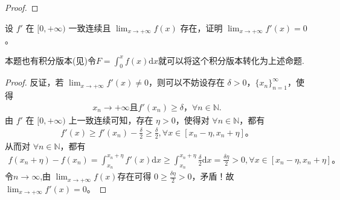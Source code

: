 \documentclass[../../main.tex]{subfiles}%
\begin{document}
\begin{proof}
\end{proof}

\begin{proposition}\label{proposition:经典导数一致连续问题}
设 $f'$ 在 $[0,+\infty)$ 一致连续且 $\lim_{x \to +\infty} f(x)$ 存在，证明 $\lim_{x \to +\infty} f'(x) = 0$。
\end{proposition}
\begin{note}
本题也有积分版本(见)令$F=\int_0^x{f\left( x \right) \mathrm{d}x}$就可以将这个积分版本转化为上述命题.
\end{note}
\begin{proof}

反证，若 $\lim_{x\rightarrow +\infty} f'(x) \ne 0$，则可以不妨设存在 $\delta >0$，$\{ x_n \}_{n=1}^{\infty}$，使得
\begin{align*}
x_n\rightarrow +\infty \text{且} f'(x_n) \geqslant \delta，\forall n\in \mathbb{N}.    
\end{align*}
由 $f'$ 在 $[0,+\infty)$ 上一致连续可知，存在 $\eta >0$，使得对 $\forall n\in \mathbb{N}$，都有
\begin{align*}
f'(x) \geqslant f'(x_n) -\frac{\delta}{2} \geqslant \frac{\delta}{2}, \forall x\in [x_n-\eta ,x_n+\eta] 。
\end{align*}
从而对 $\forall n\in \mathbb{N}$，都有
\begin{align*}
f(x_n+\eta) -f(x_n) =\int_{x_n}^{x_n+\eta} f'(x) \mathrm{d}x \geqslant \int_{x_n}^{x_n+\eta} \frac{\delta}{2} \mathrm{d}x = \frac{\delta \eta}{2} > 0, \forall x\in [x_n-\eta ,x_n+\eta] 。
\end{align*}
令$n\rightarrow \infty$,由 $\lim_{x\rightarrow +\infty} f(x) $存在可得 $0 \geqslant \frac{\delta \eta}{2} > 0$，矛盾！故 $\lim_{x\rightarrow +\infty} f'(x) =0$。

\end{proof}
\end{document}
